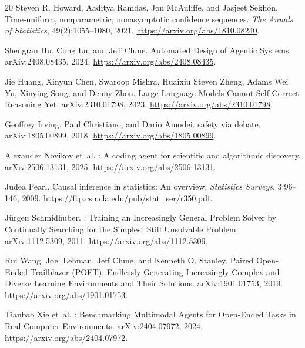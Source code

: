 \documentclass[11pt,letterpaper]{article}
\theoremstyle{remark}\newtheorem{remark}{Remark}[section]
\begin{document}
\begin{thebibliography}{20}
Steven R. Howard, Aaditya Ramdas, Jon McAuliffe, and Jasjeet Sekhon.
\newblock Time-uniform, nonparametric, nonasymptotic confidence sequences.
\newblock \emph{The Annals of Statistics}, 49(2):1055--1080, 2021.
\newblock \url{https://arxiv.org/abs/1810.08240}.

Shengran Hu, Cong Lu, and Jeff Clune.
\newblock Automated Design of Agentic Systems.
\newblock arXiv:2408.08435, 2024.
\newblock \url{https://arxiv.org/abs/2408.08435}.

Jie Huang, Xinyun Chen, Swaroop Mishra, Huaixiu Steven Zheng, Adams Wei Yu, Xinying Song, and Denny Zhou.
\newblock Large Language Models Cannot Self-Correct Reasoning Yet.
\newblock arXiv:2310.01798, 2023.
\newblock \url{https://arxiv.org/abs/2310.01798}.

Geoffrey Irving, Paul Christiano, and Dario Amodei.
 safety via debate.
\newblock arXiv:1805.00899, 2018.
\newblock \url{https://arxiv.org/abs/1805.00899}.

Alexander Novikov et~al.
: A coding agent for scientific and algorithmic discovery.
\newblock arXiv:2506.13131, 2025.
\newblock \url{https://arxiv.org/abs/2506.13131}.

Judea Pearl.
\newblock Causal inference in statistics: An overview.
\newblock \emph{Statistics Surveys}, 3:96--146, 2009.
\newblock \url{https://ftp.cs.ucla.edu/pub/stat_ser/r350.pdf}.

J{\"u}rgen Schmidhuber.
: Training an Increasingly General Problem Solver by Continually Searching for the Simplest Still Unsolvable Problem.
\newblock arXiv:1112.5309, 2011.
\newblock \url{https://arxiv.org/abs/1112.5309}.

Rui Wang, Joel Lehman, Jeff Clune, and Kenneth O. Stanley.
\newblock Paired Open-Ended Trailblazer ({POET}): Endlessly Generating Increasingly Complex and Diverse Learning Environments and Their Solutions.
\newblock arXiv:1901.01753, 2019.
\newblock \url{https://arxiv.org/abs/1901.01753}.

Tianbao Xie et~al.
: Benchmarking Multimodal Agents for Open-Ended Tasks in Real Computer Environments.
\newblock arXiv:2404.07972, 2024.
\newblock \url{https://arxiv.org/abs/2404.07972}.


\end{thebibliography}
\end{document}
